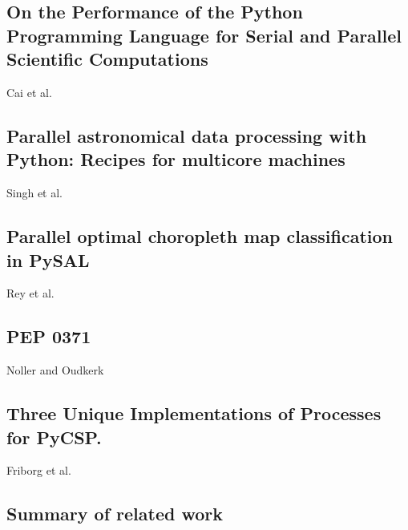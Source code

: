 \subsection{On the Performance of the Python Programming Language for Serial and Parallel Scientific Computations}
Cai et al. \cite{cai_2005_performance_otpotpplfsapsc}

\subsection{Parallel astronomical data processing with Python: Recipes for multicore machines}
Singh et al. \cite{singh_2013_parallel_padpwprfmm}

\subsection{Parallel optimal choropleth map classification in PySAL}
Rey et al. \cite{rey_2013_parallel_pocmcip}

\subsection{PEP 0371}
Noller and Oudkerk \cite{noller_pep_p0}

\subsection{Three Unique Implementations of Processes for PyCSP.}
Friborg et al. \cite{friborg_2009_three_tuiopfp}

\subsection{Summary of related work}

